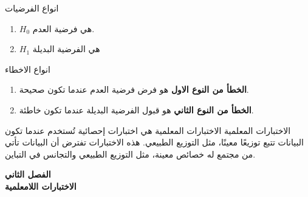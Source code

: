 		\begin{frame}
			\begin{exampleblock}{انواع الفرضيات}
				\begin{enumerate}
					\item $H_0$ هي فرضية العدم.
					\item $H_1$ هي الفرضية البديلة
				\end{enumerate}
			\end{exampleblock}
			
			\pause
			\begin{exampleblock}{انواع الاخطاء}
				\begin{enumerate}
					\item \textbf{الخطأ من النوع الاول} هو فرض فرضية العدم عندما تكون صحيحة.
					\item \textbf{الخطأ من النوع الثاني} هو قبول الفرضية البديلة عندما تكون خاطئة.
				\end{enumerate}
			\end{exampleblock}
			
			\pause
			\begin{exampleblock}{الاختبارات المعلمية}
				الاختبارات المعلمية هي اختبارات إحصائية تُستخدم عندما تكون البيانات تتبع توزيعًا معينًا، مثل التوزيع الطبيعي. هذه الاختبارات تفترض أن البيانات تأتي من مجتمع له خصائص معينة، مثل التوزيع الطبيعي والتجانس في التباين.
			\end{exampleblock}
		\end{frame}
		
		\begin{frame}
			\Huge
			\begin{center}
				\textbf{الفصل الثاني}\\
				\textbf{الاختبارات اللامعلمية}
			\end{center}
		\end{frame}
		
